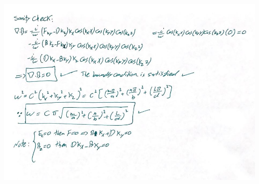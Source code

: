 \documentclass[fleqn]{article}
\begin{document}
\begin{enumerate}
    \pagebreak

    \begin{center}
      \includegraphics[height=14cm, width=16cm]{3.JPG}
    \end{center}
    

  \end{enumerate}
\end{document}
